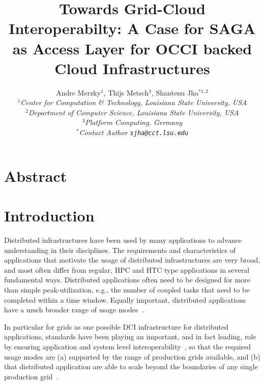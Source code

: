 \documentclass[10pt,conference,final,letterpaper,twoside,twocolumn,]{IEEEtran}
\begin{document}
\title{Towards Grid-Cloud Interoperabilty: A Case for SAGA as Access
  Layer for OCCI backed Cloud Infrastructures}

\author{Andre Merzky$^{1}$, Thijs Metsch$^{3}$, Shantenu Jha$^{*1,2}$\\
  \small{\emph{$^{1}$Center for Computation \& Technology, Louisiana State University, USA}}\\
  \small{\emph{$^{2}$Department of Computer Science, Louisiana State University, USA}}\\
  \small{\emph{$^{3}$Platform Computing, Germany}}\\
  \small{\emph{$^{*}$Contact Author \texttt{sjha@cct.lsu.edu}}} }

\maketitle

\section*{Abstract}

\section{Introduction}
\label{sec:intro}
 



 Distributed infrastructures have been used by many applications to
 advance understanding in their disciplines.  The requirements and
 characteristics of applications that motivate the usage of
 distributed infrastructures are very broad, and most often differ
 from regular, HPC and HTC type applications in several fundamental
 ways.  Distributed applications often need to be designed for more
 than simple peak-utilization, e.g., the number of coupled tasks that
 need to be completed within a time window.  Equally important,
 distributed applications have a much broader range of usage
 modes~\cite{dpa-paper}.

 In particular for grids as one possible DCI infrastructure for
 distributed applications, standards have been playing an important,
 and in fact leading, role by ensuring application and system level
 interoperability~\cite{gin,saga-gin}, so that the required usage
 modes are (a) supported by the range of production grids available,
 and (b) that distributed application are able to scale beyond the
 boundaries of any single production grid~\cite{grid_scale_out}.
\end{document}
